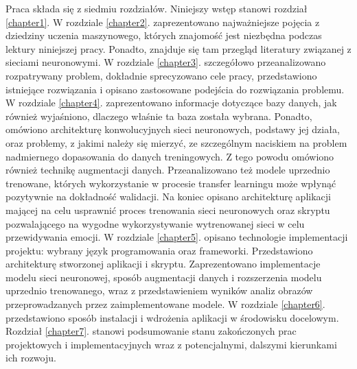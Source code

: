 Praca składa się z siedmiu rozdziałów.
Niniejszy wstęp stanowi rozdział \ref{chapter1}.
W rozdziale \ref{chapter2}. zaprezentowano najważniejsze pojęcia z dziedziny uczenia maszynowego, których znajomość jest niezbędna podczas lektury niniejszej pracy. Ponadto, znajduje się tam przegląd literatury związanej z sieciami neuronowymi.
W rozdziale \ref{chapter3}. szczegółowo przeanalizowano rozpatrywany problem, dokładnie sprecyzowano cele pracy, przedstawiono istniejące rozwiązania i opisano zastosowane podejścia do rozwiązania problemu.
W rozdziale \ref{chapter4}. zaprezentowano informacje dotyczące bazy danych, jak również wyjaśniono, dlaczego właśnie ta baza została wybrana. Ponadto, omówiono architekturę konwolucyjnych sieci neuronowych, podstawy jej działa, oraz problemy, z jakimi należy się mierzyć, ze szczególnym naciskiem na problem nadmiernego dopasowania do danych treningowych. Z tego powodu omówiono również technikę augmentacji danych. Przeanalizowano też modele uprzednio trenowane, których wykorzystanie w procesie transfer learningu może wpłynąć pozytywnie na dokładność walidacji. Na koniec opisano architekturę aplikacji mającej na celu usprawnić proces trenowania sieci neuronowych oraz skryptu pozwalającego na wygodne wykorzystywanie wytrenowanej sieci w celu przewidywania emocji. 
W rozdziale \ref{chapter5}. opisano technologie implementacji projektu: wybrany język programowania oraz frameworki. Przedstawiono architekturę stworzonej aplikacji i skryptu. Zaprezentowano implementacje modelu sieci neuronowej, sposób augmentacji danych i rozszerzenia modelu uprzednio trenowanego, wraz z przedstawieniem wyników analiz obrazów przeprowadzanych przez zaimplementowane modele.
W rozdziale \ref{chapter6}. przedstawiono sposób instalacji i wdrożenia aplikacji w środowisku docelowym.
Rozdział \ref{chapter7}. stanowi podsumowanie stanu zakończonych prac projektowych i implementacyjnych  wraz z potencjalnymi, dalszymi kierunkami ich rozwoju.
